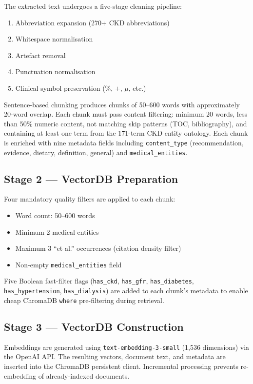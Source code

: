 \documentclass[12pt,a4paper]{report}
\begin{document}
The extracted text undergoes a five-stage cleaning pipeline:
\begin{enumerate}
  \item Abbreviation expansion (270+ CKD abbreviations)
  \item Whitespace normalisation
  \item Artefact removal
  \item Punctuation normalisation
  \item Clinical symbol preservation (\%, $\pm$, $\mu$, etc.)
\end{enumerate}

Sentence-based chunking produces chunks of 50--600 words with approximately 20-word overlap. Each chunk must pass content filtering: minimum 20 words, less than 50\% numeric content, not matching skip patterns (TOC, bibliography), and containing at least one term from the 171-term CKD entity ontology. Each chunk is enriched with nine metadata fields including \texttt{content\_type} (recommendation, evidence, dietary, definition, general) and \texttt{medical\_entities}.

\subsection{Stage 2 — VectorDB Preparation}

Four mandatory quality filters are applied to each chunk:
\begin{itemize}
  \item Word count: 50--600 words
  \item Minimum 2 medical entities
  \item Maximum 3 ``et al.'' occurrences (citation density filter)
  \item Non-empty \texttt{medical\_entities} field
\end{itemize}

Five Boolean fast-filter flags (\texttt{has\_ckd}, \texttt{has\_gfr}, \texttt{has\_diabetes}, \texttt{has\_hypertension}, \texttt{has\_dialysis}) are added to each chunk's metadata to enable cheap ChromaDB \texttt{where} pre-filtering during retrieval.

\subsection{Stage 3 — VectorDB Construction}

Embeddings are generated using \texttt{text-embedding-3-small} (1,536 dimensions) via the OpenAI API. The resulting vectors, document text, and metadata are inserted into the ChromaDB persistent client. Incremental processing prevents re-embedding of already-indexed documents.
\end{document}
